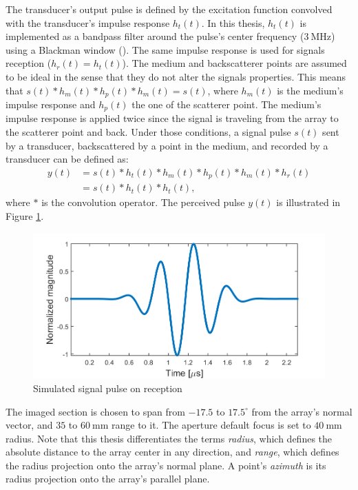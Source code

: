 The transducer's output pulse is defined by the excitation function convolved with the transducer's impulse response $h_t(t)$.
In this thesis, $h_t(t)$ is implemented as a bandpass filter around the pulse's center frequency ($3~$MHz) using a Blackman window (\cite{blackman}). The same impulse response is used for signals reception ($h_r(t) = h_t(t)$). The medium and backscatterer points are assumed to be ideal in the sense that they do not alter the signals properties. This means that $s(t) * h_m(t) * h_p(t) * h_m(t) = s(t)$, where $h_m(t)$ is the medium's impulse response and $h_p(t)$ the one of the scatterer point. The medium's impulse response is applied twice since the signal is traveling from the array to the scatterer point and back.
Under those conditions, a signal pulse $s(t)$ sent by a transducer, backscattered by a point in the medium, and recorded by a transducer can be defined as:
\begin{align}
    y(t) &= s(t) * h_t(t) * h_m(t) * h_p(t) * h_m(t) * h_r(t) \nonumber \\
    &= s(t) * h_t(t) * h_t(t),
\end{align}
\noindent
where $*$ is the convolution operator. The perceived pulse $y(t)$ is illustrated in Figure \ref{fig:pulse}.

\begin{figure}
    \centering
    \includegraphics[width=\linewidth]{./images/others/pulse.png}
    \caption{Simulated signal pulse on reception}
    \label{fig:pulse}
\end{figure}

The imaged section is chosen to span from $-17.5$ to $17.5^\circ$ from the array's normal vector, and $35$ to $60~$mm range to it. The aperture default focus is set to $40~$mm radius. Note that this thesis differentiates the terms \textit{radius}, which defines the absolute distance to the array center in any direction, and \textit{range}, which defines the radius projection onto the array's normal plane. A point's \textit{azimuth} is its radius projection onto the array's parallel plane.

